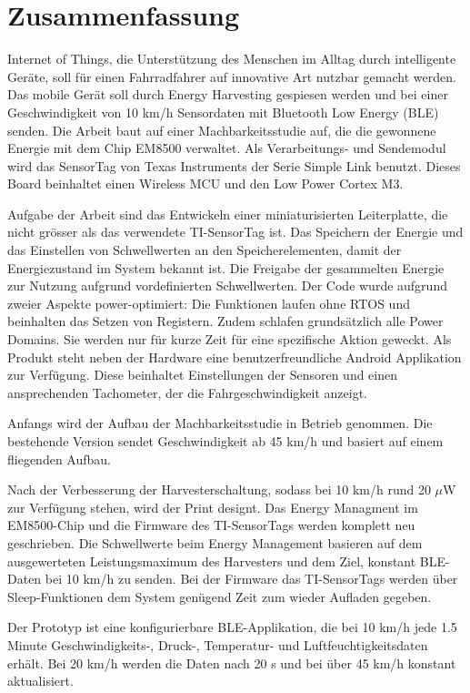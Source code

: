 \chapter*{Zusammenfassung}

Internet of Things, die Unterstützung des Menschen im Alltag durch intelligente Geräte, soll für einen Fahrradfahrer auf innovative Art nutzbar gemacht werden. Das  mobile Gerät soll durch Energy Harvesting gespiesen werden und bei einer Geschwindigkeit von 10 km/h Sensordaten mit Bluetooth Low Energy (BLE) senden. Die Arbeit baut auf einer Machbarkeitsstudie auf, die die gewonnene Energie mit dem Chip EM8500 verwaltet. Als Verarbeitungs- und Sendemodul wird das SensorTag von Texas Instruments der Serie Simple Link benutzt. Dieses Board beinhaltet einen Wireless MCU und den Low Power Cortex M3. 


Aufgabe der Arbeit sind das Entwickeln einer miniaturisierten Leiterplatte, die nicht grösser als das verwendete TI-SensorTag ist. Das Speichern der Energie und das Einstellen von Schwellwerten an den Speicherelementen, damit der Energiezustand im System bekannt ist. Die Freigabe der gesammelten Energie zur Nutzung aufgrund vordefinierten Schwellwerten. Der Code wurde aufgrund zweier Aspekte power-optimiert: Die Funktionen laufen ohne RTOS und beinhalten das Setzen von Registern.  Zudem schlafen grundsätzlich alle Power Domains. Sie werden nur für kurze Zeit für eine spezifische Aktion geweckt. Als Produkt steht neben der Hardware eine benutzerfreundliche Android Applikation zur Verfügung. Diese beinhaltet Einstellungen der Sensoren und einen ansprechenden Tachometer, der die Fahrgeschwindigkeit anzeigt. 


Anfangs wird der Aufbau der Machbarkeitsstudie in Betrieb genommen. Die bestehende Version sendet Geschwindigkeit ab 45 km/h und basiert auf einem fliegenden Aufbau.


Nach der Verbesserung der Harvesterschaltung, sodass bei 10 km/h rund 20 $\mu$W zur Verfügung stehen, wird der Print designt. Das Energy Managment im EM8500-Chip und die Firmware des TI-SensorTags werden komplett neu geschrieben. Die Schwellwerte beim Energy Management basieren auf dem ausgewerteten Leistungsmaximum des Harvesters und dem Ziel, konstant BLE-Daten bei 10 km/h zu senden. Bei der Firmware das TI-SensorTags werden über Sleep-Funktionen dem System genügend Zeit zum wieder Aufladen gegeben. 


Der Prototyp ist eine konfigurierbare BLE-Applikation, die bei 10 km/h jede 1.5 Minute Geschwindigkeits-, Druck-, Temperatur- und Luftfeuchtigkeitsdaten erhält. Bei 20 km/h werden die Daten nach 20 s und bei über 45 km/h konstant aktualisiert.

